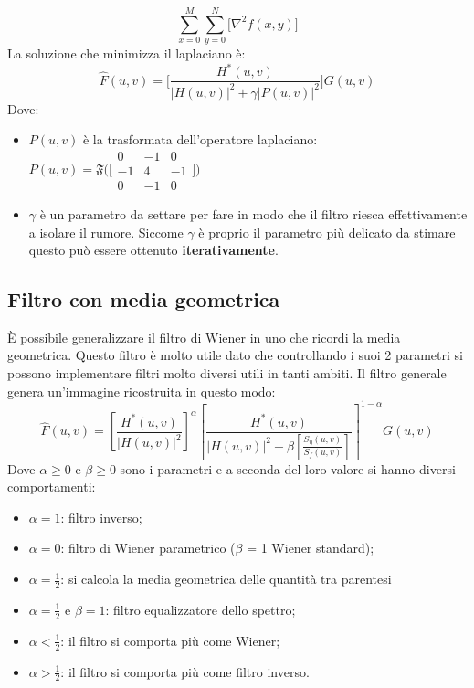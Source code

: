 \begin{equation}
	\sum_{x=0}^{M}\sum_{y=0}^{N} \big[\nabla^2f(x,y)\big]
\end{equation}
La soluzione che minimizza il laplaciano è:
\begin{equation}
	\hat{F}(u,v) = \Bigg[\frac{H^*(u,v)}{|H(u,v)|^2 + \gamma|P(u,v)|^2}\Bigg]G(u,v)
\end{equation}
Dove:
\begin{itemize}
	\item $P(u,v)$ è la trasformata dell'operatore laplaciano: $P(u,v) = \mathfrak{F} \Big( \Big[
	\begin{smallmatrix}
		0&-1&0\\
		-1&4&-1\\
		0&-1&0
	\end{smallmatrix} \Big]\Big)$ 
	\item $\gamma$ è un parametro da settare per fare in modo che il filtro riesca effettivamente a isolare il rumore. Siccome $\gamma$ è proprio il parametro più delicato da stimare questo può essere ottenuto \textbf{iterativamente}.
\end{itemize}

\subsection{Filtro con media geometrica}
È possibile generalizzare il filtro di Wiener in uno che ricordi la media geometrica. Questo filtro è molto utile dato che controllando i suoi 2 parametri si possono implementare filtri molto diversi utili in tanti ambiti. Il filtro generale genera un'immagine ricostruita in questo modo:
\begin{equation}
	\hat{F}(u,v) = \left[\frac{H^*(u,v)}{|H(u,v)|^2}\right]^{\alpha}\left[\frac{H^*(u,v)}{|H(u,v)|^2 +\beta\left[\frac{S_{\eta}(u,v)}{S_f(u,v)}\right]}\right]^{1-\alpha}G(u,v)
\end{equation}
Dove $\alpha \geq 0$ e $\beta \geq 0$ sono i parametri e a seconda del loro valore si hanno diversi comportamenti:
\begin{itemize}
	\item $\alpha = 1$: filtro inverso;
	\item $\alpha = 0$: filtro di Wiener parametrico ($\beta$ = 1 Wiener standard);
	\item $\alpha = \frac{1}{2}$: si calcola la media geometrica delle quantità tra parentesi
	\item $\alpha = \frac{1}{2}$ e $\beta = 1$: filtro equalizzatore dello spettro;
	\item $\alpha<\frac{1}{2}$: il filtro si comporta più come Wiener;
	\item $\alpha>\frac{1}{2}$: il filtro si comporta più come filtro inverso.
\end{itemize}

